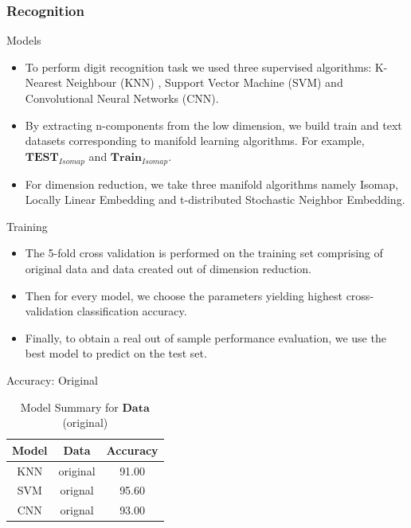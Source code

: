 \documentclass{beamer}
\theoremstyle{plain}
\theoremstyle{definition}
\theoremstyle{plain}
\theoremstyle{plain}
\begin{document}
\subsubsection{Recognition}
\begin{frame}{Models}
\begin{itemize}
\item To perform digit recognition task we used three supervised algorithms:  K-Nearest Neighbour (KNN) , Support Vector Machine (SVM)  and Convolutional Neural Networks (CNN).
\item By extracting n-components from the low dimension, we build train and text datasets corresponding to manifold learning algorithms. For example, $\mathbf{TEST}_{Isomap}$ and $\mathbf{Train}_{Isomap}$.
\item For dimension reduction, we take three manifold algorithms namely Isomap, Locally Linear Embedding and t-distributed Stochastic Neighbor Embedding.
\end{itemize}
\end{frame}
\begin{frame}{Training}
\begin{itemize}
\item The 5-fold cross validation is performed on the training set comprising of original data and data created out of dimension reduction.
\item Then for every model, we choose the parameters yielding highest cross-validation classification accuracy.
\item  Finally, to obtain a real out of sample performance evaluation, we use the best model to predict on the test set.
\end{itemize}
\end{frame}
\begin{frame}{Accuracy: Original}
\begin{table}[ht!]
\caption{Model Summary for $\mathbf{Data}$(original)}
\centering
\begin{tabular}{c c c }
\hline\hline
Model & Data & Accuracy\\ [0.5ex]
\hline
KNN & original& 91.00 \\
SVM & orignal & 95.60 \\
CNN & orignal & 93.00\\ [1ex]
\hline
\end{tabular}
\label{R:ORG}
\end{table}

\end{frame}
\end{document}
